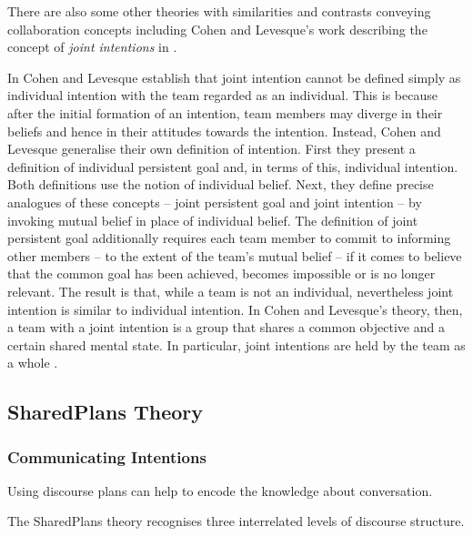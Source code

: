 \documentclass[11pt]{article}
\begin{document}
There are also some other theories with similarities and contrasts conveying
collaboration concepts including Cohen and Levesque's work describing the
concept of \textit{joint intentions} in \cite{cohen:teamwork,
levesque:acting-together}.

In \cite{cohen:teamwork} Cohen and Levesque establish that joint intention
cannot be defined simply as individual intention with the team regarded as an
individual. This is because after the initial formation of an intention, team
members may diverge in their beliefs and hence in their attitudes towards the
intention. Instead, Cohen and Levesque generalise their own definition of
intention. First they present a definition of individual persistent goal and, in
terms of this, individual intention. Both definitions use the notion of
individual belief. Next, they define precise analogues of these concepts --
joint persistent goal and joint intention -- by invoking mutual belief in place
of individual belief. The definition of joint persistent goal additionally
requires each team member to commit to informing other members -- to the extent
of the team's mutual belief -- if it comes to believe that the common goal has
been achieved, becomes impossible or is no longer relevant. The result is that,
while a team is not an individual, nevertheless joint intention is similar to
individual intention. In Cohen and Levesque's theory, then, a team with a joint
intention is a group that shares a common objective and a certain shared mental
state. In particular, joint intentions are held by the team as a whole
\cite{jarvis:teams-multiagent-systems}.

\subsection{SharedPlans Theory}
\label{sec:sharedplans}

\subsubsection{Communicating Intentions}

Using discourse plans can help to encode the knowledge about conversation.

The SharedPlans theory recognises three interrelated levels of discourse
structure.
\end{document}
